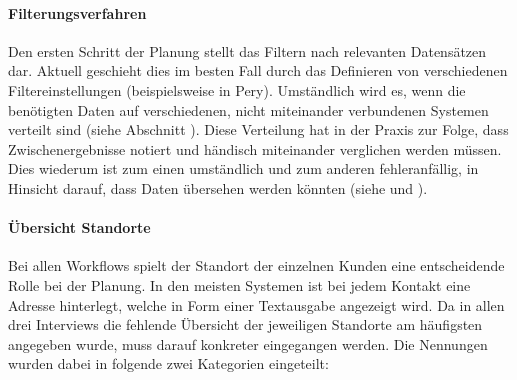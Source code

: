 \documentclass[Bachelorarbeit.tex]{subfiles}
\begin{document}
\paragraph{Filterungsverfahren}
\label{interviewsAnalyseFilterungsverfahren}
Den ersten Schritt der Planung stellt das Filtern nach relevanten Datensätzen dar.
Aktuell geschieht dies im besten Fall durch das Definieren von verschiedenen Filtereinstellungen (beispielsweise in Pery).
Umständlich wird es, wenn die benötigten Daten auf verschiedenen, nicht miteinander verbundenen Systemen verteilt sind (siehe Abschnitt ). 
Diese Verteilung hat in der Praxis zur Folge, dass Zwischenergebnisse notiert und händisch miteinander verglichen werden müssen.
Dies wiederum ist zum einen umständlich und zum anderen fehleranfällig, in Hinsicht darauf, dass Daten übersehen werden könnten (siehe  und ).


\paragraph*{Übersicht Standorte}
\label{interviewsAnalyseStandorte}
Bei allen Workflows spielt der Standort der einzelnen Kunden eine entscheidende Rolle bei der Planung.
In den meisten Systemen ist bei jedem Kontakt eine Adresse hinterlegt, welche in Form einer Textausgabe angezeigt wird.
Da in allen drei Interviews die fehlende Übersicht der jeweiligen Standorte am häufigsten angegeben wurde, muss darauf konkreter eingegangen werden. 
Die Nennungen wurden dabei in folgende zwei Kategorien eingeteilt:
\end{document}
